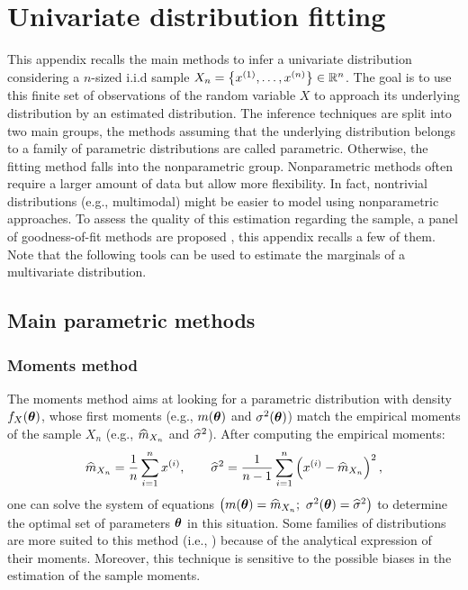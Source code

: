 \chapter{Univariate distribution fitting}
\label{apx:A}

This appendix recalls the main methods to infer a univariate distribution considering a $n$-sized i.i.d sample $X_n = \left\{x^{(1)}, \dots, x^{(n)}\right\} \in \mathbb{R}^{n}$. 
The goal is to use this finite set of observations of the random variable $X$ to approach its underlying distribution by an estimated distribution.
The inference techniques are split into two main groups, the methods assuming that the underlying distribution belongs to a family of parametric distributions are called parametric. 
Otherwise, the fitting method falls into the nonparametric group. 
Nonparametric methods often require a larger amount of data but allow more flexibility. 
In fact, nontrivial distributions (e.g., multimodal) might be easier to model using nonparametric approaches.
To assess the quality of this estimation regarding the sample, a panel of goodness-of-fit methods are proposed , this appendix recalls a few of them. 
Note that the following tools can be used to estimate the marginals of a multivariate distribution.

\section{Main parametric methods}

\subsection*{Moments method}
The moments method aims at looking for a parametric distribution with density $f_X({\boldsymbol{\theta}})$, whose first moments (e.g., $m({\boldsymbol{\theta}})$ and $\sigma^2({\boldsymbol{\theta}})$) match 
the empirical moments of the sample $X_n$ (e.g., $\widehat{m}_{X_n}$ and $\widehat{\sigma}^2$). After computing the empirical moments: 
\begin{equation}
    \widehat{m}_{X_n} = \frac1n \sum_{i=1}^{n} x^{(i)}, \qquad \widehat{\sigma}^2 = \frac{1}{n-1} \sum_{i=1}^{n} \left(x^{(i)} - \widehat{m}_{X_n}\right)^2,
\end{equation} 
one can solve the system of equations $\left(m(\btheta) = \what{m}_{X_n}; \ \sigma^2(\btheta) = \what{\sigma}^2\right)$ to determine the optimal set of parameters ${\boldsymbol{\theta}}$ in this situation. 
Some families of distributions are more suited to this method (i.e., ) because of the analytical expression of their moments. 
Moreover, this technique is sensitive to the possible biases in the estimation of the sample moments.

